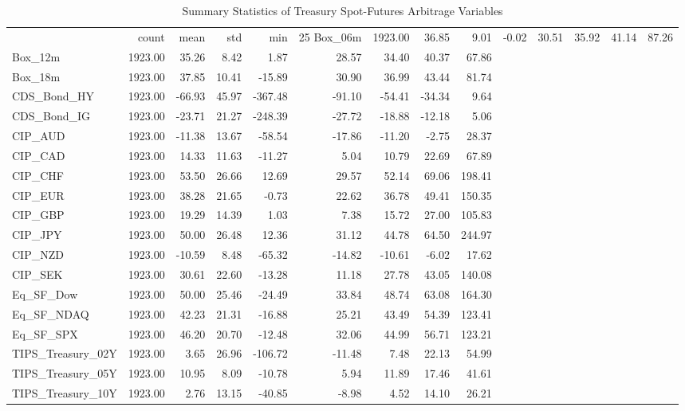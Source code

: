 \begin{table}
\caption{Summary Statistics of Treasury Spot-Futures Arbitrage Variables}
\label{tab:summary_statistics}
\begin{tabular}{lrrrrrrrr}
\toprule
 & count & mean & std & min & 25%
\midrule
Box_06m & 1923.00 & 36.85 & 9.01 & -0.02 & 30.51 & 35.92 & 41.14 & 87.26 \\
Box_12m & 1923.00 & 35.26 & 8.42 & 1.87 & 28.57 & 34.40 & 40.37 & 67.86 \\
Box_18m & 1923.00 & 37.85 & 10.41 & -15.89 & 30.90 & 36.99 & 43.44 & 81.74 \\
CDS_Bond_HY & 1923.00 & -66.93 & 45.97 & -367.48 & -91.10 & -54.41 & -34.34 & 9.64 \\
CDS_Bond_IG & 1923.00 & -23.71 & 21.27 & -248.39 & -27.72 & -18.88 & -12.18 & 5.06 \\
CIP_AUD & 1923.00 & -11.38 & 13.67 & -58.54 & -17.86 & -11.20 & -2.75 & 28.37 \\
CIP_CAD & 1923.00 & 14.33 & 11.63 & -11.27 & 5.04 & 10.79 & 22.69 & 67.89 \\
CIP_CHF & 1923.00 & 53.50 & 26.66 & 12.69 & 29.57 & 52.14 & 69.06 & 198.41 \\
CIP_EUR & 1923.00 & 38.28 & 21.65 & -0.73 & 22.62 & 36.78 & 49.41 & 150.35 \\
CIP_GBP & 1923.00 & 19.29 & 14.39 & 1.03 & 7.38 & 15.72 & 27.00 & 105.83 \\
CIP_JPY & 1923.00 & 50.00 & 26.48 & 12.36 & 31.12 & 44.78 & 64.50 & 244.97 \\
CIP_NZD & 1923.00 & -10.59 & 8.48 & -65.32 & -14.82 & -10.61 & -6.02 & 17.62 \\
CIP_SEK & 1923.00 & 30.61 & 22.60 & -13.28 & 11.18 & 27.78 & 43.05 & 140.08 \\
Eq_SF_Dow & 1923.00 & 50.00 & 25.46 & -24.49 & 33.84 & 48.74 & 63.08 & 164.30 \\
Eq_SF_NDAQ & 1923.00 & 42.23 & 21.31 & -16.88 & 25.21 & 43.49 & 54.39 & 123.41 \\
Eq_SF_SPX & 1923.00 & 46.20 & 20.70 & -12.48 & 32.06 & 44.99 & 56.71 & 123.21 \\
TIPS_Treasury_02Y & 1923.00 & 3.65 & 26.96 & -106.72 & -11.48 & 7.48 & 22.13 & 54.99 \\
TIPS_Treasury_05Y & 1923.00 & 10.95 & 8.09 & -10.78 & 5.94 & 11.89 & 17.46 & 41.61 \\
TIPS_Treasury_10Y & 1923.00 & 2.76 & 13.15 & -40.85 & -8.98 & 4.52 & 14.10 & 26.21 \\

\end{tabular}
\end{table}
